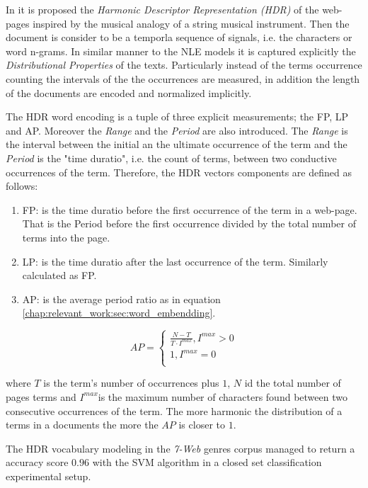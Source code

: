 In \parencite{kim2010formulating} it is proposed the \textit{Harmonic Descriptor Representation (HDR)} of the web-pages inspired by the musical analogy of a string musical instrument. Then the document is consider to be a temporla sequence of signals, i.e. the characters or word n-grams. In similar manner to the NLE models it is captured explicitly the \textit{Distributional Properties} of the texts. Particularly instead of the terms occurrence counting the intervals of the the occurrences are measured, in addition the length of the documents are encoded and normalized implicitly. 

The HDR word encoding is a tuple of three explicit measurements; the FP, LP and AP. Moreover the \textit{Range} and the \textit{Period} are also introduced. The \textit{Range} is the interval between the initial an the ultimate occurrence of the term and the \textit{Period} is the "time duratio", i.e. the count of terms, between two conductive occurrences of the term. Therefore, the HDR vectors components are defined as follows:

\begin{enumerate}
\item FP: is the time duratio before the first occurrence of the term in a web-page. That is the Period before the first occurrence divided by the total number of terms into the page.
\item LP: is the time duratio after the last occurrence of the term. Similarly calculated as FP.
\item AP: is the average period ratio as in equation \ref{chap:relevant_work:sec:word_embendding}.
\end{enumerate}

\begin{equation}\label{chap:relevant_work:sec:word_embendding}
	AP  =
      \begin{cases}
        \frac{N - T}{T \cdot I^{max}}, I^{max} > 0  \\
        1, I^{max} = 0 \\ 
       \end{cases}
\end{equation}

\noindent
where $T$ is the term's number of occurrences plus $1$, $N$ id the total number of pages terms and $I^{max}$is the maximum number of characters found between two consecutive occurrences of the term. The more harmonic the distribution of a terms in a documents the more the $AP$ is closer to $1$.

The HDR vocabulary modeling in the \textit{7-Web} genres corpus managed to return a accuracy score $0.96$ with the SVM algorithm in a closed set classification experimental setup.


